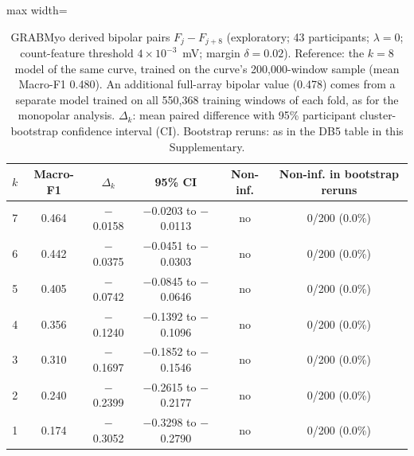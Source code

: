\begin{table}[htbp]
\centering
\small
\caption{GRABMyo derived bipolar pairs $F_j - F_{j+8}$ (exploratory; 43 participants; $\lambda = 0$; count-feature threshold $4 \times 10^{-3}$~mV; margin $\delta = 0.02$). Reference: the $k = 8$ model of the same curve, trained on the curve's 200,000-window sample (mean Macro-F1 0.480). An additional full-array bipolar value (0.478) comes from a separate model trained on all 550{,}368 training windows of each fold, as for the monopolar analysis. $\Delta_k$: mean paired difference with 95\% participant cluster-bootstrap confidence interval (CI). Bootstrap reruns: as in the DB5 table in this Supplementary.}
\label{tab:bipolar}
\setlength{\tabcolsep}{4pt}
\begin{adjustbox}{max width=\textwidth}
\begin{tabular}{rccccc}
\toprule
$k$ & Macro-F1 & $\Delta_k$ & 95\% CI & Non-inf. & Non-inf. in bootstrap reruns \\
\midrule
7 & 0.464 & $-$0.0158 & $-$0.0203 to $-$0.0113 & no & 0/200 (0.0\%) \\
6 & 0.442 & $-$0.0375 & $-$0.0451 to $-$0.0303 & no & 0/200 (0.0\%) \\
5 & 0.405 & $-$0.0742 & $-$0.0845 to $-$0.0646 & no & 0/200 (0.0\%) \\
4 & 0.356 & $-$0.1240 & $-$0.1392 to $-$0.1096 & no & 0/200 (0.0\%) \\
3 & 0.310 & $-$0.1697 & $-$0.1852 to $-$0.1546 & no & 0/200 (0.0\%) \\
2 & 0.240 & $-$0.2399 & $-$0.2615 to $-$0.2177 & no & 0/200 (0.0\%) \\
1 & 0.174 & $-$0.3052 & $-$0.3298 to $-$0.2790 & no & 0/200 (0.0\%) \\
\bottomrule
\end{tabular}
\end{adjustbox}
\end{table}
